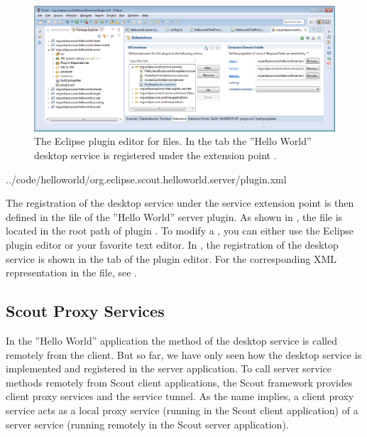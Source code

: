 \documentclass[a4paper,10pt,twoside]{book}
\begin{document}
\begin{figure}
\includegraphics[width=14cm]{sdk_plugin_editor_desktopservice.png}
\caption{The Eclipse plugin editor for  files.
In the tab  the ''Hello World'' desktop service is registered under the extension point .
}
\end{figure}


{../code/helloworld/org.eclipse.scout.helloworld.server/plugin.xml}

The registration of the desktop service under the service extension point is then defined in the  file of the ''Hello World'' server plugin.
As shown in , the  file is located in the root path of plugin .
To modify a , you can either use the Eclipse plugin editor or your favorite text editor.
In , the registration of the desktop service is shown in the  tab of the plugin editor.
For the corresponding XML representation in the  file, see .

\subsection{Scout Proxy Services}

In the ''Hello World'' application the  method of the desktop service is called remotely from the client.
But so far, we have only seen how the desktop service is implemented and registered in the server application.
To call server service methods remotely from Scout client applications, the Scout framework provides client proxy services and the service tunnel.
As the name implies, a client proxy service acts as a local proxy service (running in the Scout client application) of a server service (running remotely in the Scout server application).
\end{document}
